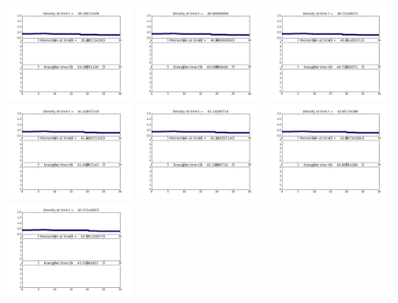\documentclass[11pt]{article}
\begin{document}
\vskip 10pt 
\includegraphics[width=0.316666666667\textwidth]{frame0055fig1.png}
\vskip 10pt 
\includegraphics[width=0.316666666667\textwidth]{frame0056fig1.png}
\vskip 10pt 
\includegraphics[width=0.316666666667\textwidth]{frame0057fig1.png}
\vskip 10pt 
\includegraphics[width=0.316666666667\textwidth]{frame0058fig1.png}
\vskip 10pt 
\includegraphics[width=0.316666666667\textwidth]{frame0059fig1.png}
\vskip 10pt 
\includegraphics[width=0.316666666667\textwidth]{frame0060fig1.png}
\vskip 10pt 
\includegraphics[width=0.316666666667\textwidth]{frame0061fig1.png}
\end{document}
